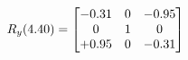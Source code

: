 \documentclass[preview]{standalone}
\begin{document}
\begin{align*}
\special{dvisvgm:raw <g id='unique000'>}R_{y}(4.40) = \begin{bmatrix}-0.31 & 0 & -0.95 \\0 & 1 & 0 \\+0.95 & 0 & -0.31\end{bmatrix}\special{dvisvgm:raw </g>}
\end{align*}
\end{document}
